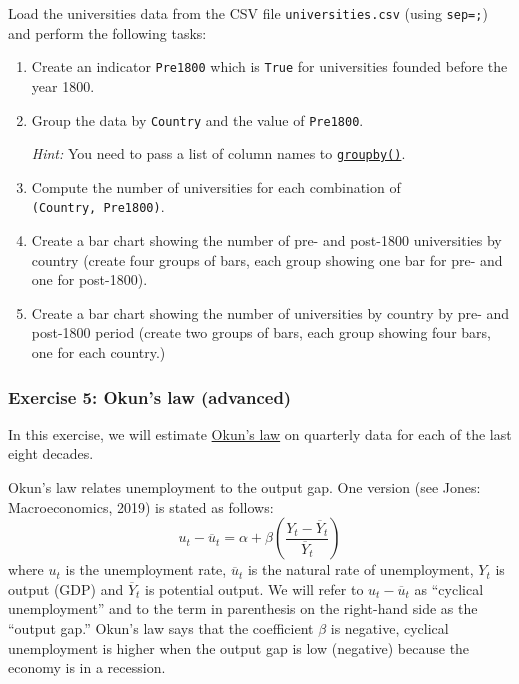\documentclass{scrartcl}
\begin{document}
Load the universities data from the CSV file \texttt{universities.csv}
(using \texttt{sep=\textquotesingle{};\textquotesingle{}}) and perform
the following tasks:

\begin{enumerate}
\def\labelenumi{\arabic{enumi}.}
\item
  Create an indicator \texttt{Pre1800} which is \texttt{True} for
  universities founded before the year 1800.
\item
  Group the data by \texttt{Country} and the value of \texttt{Pre1800}.

  \emph{Hint:} You need to pass a list of column names to
  \href{https://pandas.pydata.org/pandas-docs/stable/reference/api/pandas.DataFrame.groupby.html}{\texttt{groupby()}}.
\item
  Compute the number of universities for each combination of
  \texttt{(Country,\ Pre1800)}.
\item
  Create a bar chart showing the number of pre- and post-1800
  universities by country (\ie create four groups of bars, each group
  showing one bar for pre- and one for post-1800).
\item
  Create a bar chart showing the number of universities by country by
  pre- and post-1800 period (\ie create two groups of bars, each group
  showing four bars, one for each country.)
\end{enumerate}

    \hypertarget{exercise-5-okuns-law-advanced}{%
\subsubsection{Exercise 5: Okun's law
(advanced)}\label{exercise-5-okuns-law-advanced}}

In this exercise, we will estimate
\href{https://en.wikipedia.org/wiki/Okun\%27s_law}{Okun's law} on
quarterly data for each of the last eight decades.

Okun's law relates unemployment to the output gap. One version (see
Jones: Macroeconomics, 2019) is stated as follows: \[
u_t - \overline{u}_{t} = 
\alpha + \beta \left(\frac{Y_t - \overline{Y}_t}{\overline{Y}_t}\right)
\] where \(u_t\) is the unemployment rate, \(\overline{u}_{t}\) is the
natural rate of unemployment, \(Y_t\) is output (GDP) and
\(\overline{Y}_{t}\) is potential output. We will refer to
\(u_t-\overline{u}_{t}\) as ``cyclical unemployment'' and to the term in
parenthesis on the right-hand side as the ``output gap.'' Okun's law
says that the coefficient \(\beta\) is negative, \ie cyclical
unemployment is higher when the output gap is low (negative) because the
economy is in a recession.
\end{document}
